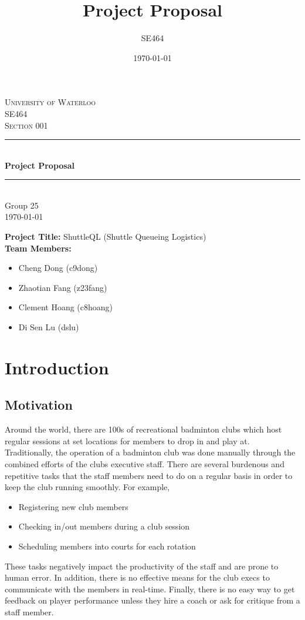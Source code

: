 \documentclass{article}
\title{Project Proposal}
\author{SE464}
\date{\today}
\begin{document}
\begin{titlepage}
\newcommand{\HRule}{\rule{\linewidth}{0.5mm}}

\center

\textsc{\huge University of Waterloo}\\[3cm]
\textsc{\LARGE SE464}\\[1.5cm]
\textsc{\Large Section 001}\\[1.5cm]

\HRule \\[0.75cm]
{ \Huge \bfseries Project Proposal}\\[0.5cm]
\HRule \\[2cm]

\Large Group 25 \\  [8cm]

{\Large \today}\\

\vfill
\end{titlepage}

\noindent\textbf{Project Title:} ShuttleQL (Shuttle Queueing Logistics) \\
\textbf{Team Members:}
\begin{itemize}
  \item Cheng Dong (c9dong)
  \item Zhaotian Fang (z23fang)
  \item Clement Hoang (c8hoang)
  \item Di Sen Lu (dslu)
\end{itemize}

\section{Introduction}
\subsection{Motivation}
Around the world, there are 100s of recreational badminton clubs which host
regular sessions at set locations for members to drop in and play at.
Traditionally, the operation of a badminton club was done manually through the
combined efforts of the clubs executive staff. There are several burdenous
and repetitive tasks that the staff members need to do on a regular basis in
order to keep the club running smoothly. For example,
\begin{itemize}
  \item Registering new club members
  \item Checking in/out members during a club session
  \item Scheduling members into courts for each rotation
\end{itemize}
These tasks negatively impact the productivity of the staff and are prone
to human error.
In addition, there is no effective means for the club execs to communicate
with the members in real-time.
Finally, there is no easy way to get feedback on player performance unless
they hire a coach or ask for critique from a staff member.
\end{document}
